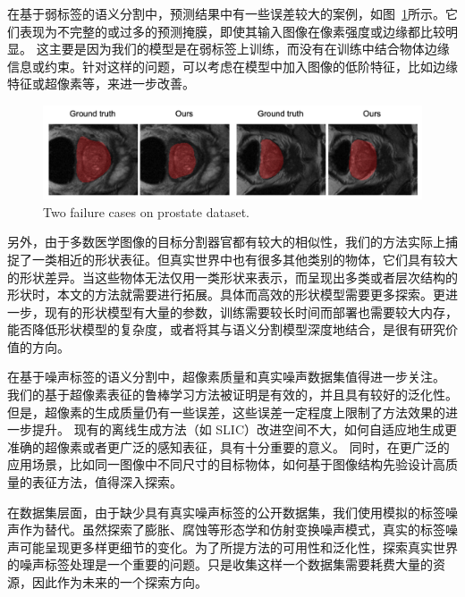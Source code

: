 在基于弱标签的语义分割中，预测结果中有一些误差较大的案例，如图~\ref{fig:failure}所示。它们表现为不完整的或过多的预测掩膜，即使其输入图像在像素强度或边缘都比较明显。
这主要是因为我们的模型是在弱标签上训练，而没有在训练中结合物体边缘信息或约束。针对这样的问题，可以考虑在模型中加入图像的低阶特征，比如边缘特征或超像素等，来进一步改善。
    \begin{figure}[tbp]
        \centering 
        \includegraphics[width=1.0\textwidth]{img/c3/f51m.png}
        {Two failure cases on prostate dataset.}
        \label{fig:failure}
    \end{figure}

另外，由于多数医学图像的目标分割器官都有较大的相似性，我们的方法实际上捕捉了一类相近的形状表征。但真实世界中也有很多其他类别的物体，它们具有较大的形状差异。当这些物体无法仅用一类形状来表示，而呈现出多类或者层次结构的形状时，本文的方法就需要进行拓展。具体而高效的形状模型需要更多探索。更进一步，现有的形状模型有大量的参数，训练需要较长时间而部署也需要较大内存，能否降低形状模型的复杂度，或者将其与语义分割模型深度地结合，是很有研究价值的方向。

在基于噪声标签的语义分割中，超像素质量和真实噪声数据集值得进一步关注。
我们的基于超像素表征的鲁棒学习方法被证明是有效的，并且具有较好的泛化性。但是，超像素的生成质量仍有一些误差，这些误差一定程度上限制了方法效果的进一步提升。
现有的离线生成方法（如 SLIC）改进空间不大，如何自适应地生成更准确的超像素或者更广泛的感知表征，具有十分重要的意义。
同时，在更广泛的应用场景，比如同一图像中不同尺寸的目标物体，如何基于图像结构先验设计高质量的表征方法，值得深入探索。

在数据集层面，由于缺少具有真实噪声标签的公开数据集，我们使用模拟的标签噪声作为替代。虽然探索了膨胀、腐蚀等形态学和仿射变换噪声模式，真实的标签噪声可能呈现更多样更细节的变化。为了所提方法的可用性和泛化性，探索真实世界的噪声标签处理是一个重要的问题。只是收集这样一个数据集需要耗费大量的资源，因此作为未来的一个探索方向。